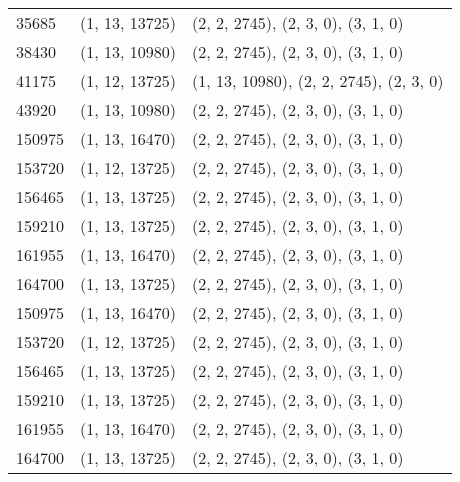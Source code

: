 \documentclass{article}
\begin{document}
\begin{longtable}{|l|l|l|}
    35685  & (1, 13, 13725) & (2,  2,  2745), (2,  3,    0), (3, 1, 0) \\
    38430  & (1, 13, 10980) & (2,  2,  2745), (2,  3,    0), (3, 1, 0) \\
    41175  & (1, 12, 13725) & (1, 13, 10980), (2,  2, 2745), (2, 3, 0) \\
    43920  & (1, 13, 10980) & (2,  2,  2745), (2,  3,    0), (3, 1, 0) \\
    150975 & (1, 13, 16470) & (2,  2,  2745), (2,  3,    0), (3, 1, 0) \\
    153720 & (1, 12, 13725) & (2,  2,  2745), (2,  3,    0), (3, 1, 0) \\
    156465 & (1, 13, 13725) & (2,  2,  2745), (2,  3,    0), (3, 1, 0) \\
    159210 & (1, 13, 13725) & (2,  2,  2745), (2,  3,    0), (3, 1, 0) \\
    161955 & (1, 13, 16470) & (2,  2,  2745), (2,  3,    0), (3, 1, 0) \\
    164700 & (1, 13, 13725) & (2,  2,  2745), (2,  3,    0), (3, 1, 0) \\
    150975 & (1, 13, 16470) & (2,  2,  2745), (2,  3,    0), (3, 1, 0) \\
    153720 & (1, 12, 13725) & (2,  2,  2745), (2,  3,    0), (3, 1, 0) \\
    156465 & (1, 13, 13725) & (2,  2,  2745), (2,  3,    0), (3, 1, 0) \\
    159210 & (1, 13, 13725) & (2,  2,  2745), (2,  3,    0), (3, 1, 0) \\
    161955 & (1, 13, 16470) & (2,  2,  2745), (2,  3,    0), (3, 1, 0) \\
    164700 & (1, 13, 13725) & (2,  2,  2745), (2,  3,    0), (3, 1, 0) \\
\end{longtable}
\end{document}
